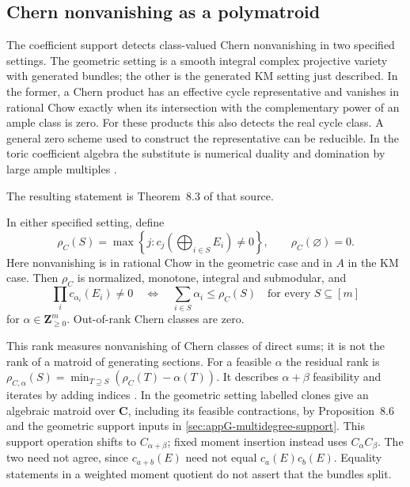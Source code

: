 \subsection{Chern nonvanishing as a polymatroid}
\label{sec:appG-Chern-nonvanishing}

The coefficient support detects class-valued Chern nonvanishing
in two specified settings. The geometric setting is a smooth
integral complex projective variety with generated bundles;
the other is the generated KM setting just described.
In the former, a Chern product has an effective cycle
representative and vanishes in rational Chow exactly when its
intersection with the complementary power of an ample class
is zero. For these products this also detects the real cycle
class. A general zero scheme used to construct the representative
can be reducible. In the toric coefficient algebra the substitute
is numerical duality and domination by large ample multiples
\cite[Lemmas~8.1--8.2]{NguyenDangWang26ChernFlowV4}.

The resulting statement is Theorem~8.3 of that source.
\begin{theorem}
\label{thm:appG-Chern-nonvanishing}
In either specified setting, define
\[
 \rho_C(S)=\max\left\{j:c_j\left(\bigoplus_{i\in S}E_i\right)
                                      \ne0\right\},
 \qquad\rho_C(\varnothing)=0.
\tag{G.31}\label{eq:appG-Chern-rank}
\]
Here nonvanishing is in rational Chow in the geometric case and
in $A$ in the KM case. Then $\rho_C$ is normalized, monotone,
integral and submodular, and
\[
 \prod_i c_{\alpha_i}(E_i)\ne0
   \quad\Longleftrightarrow\quad
 \sum_{i\in S}\alpha_i\leq\rho_C(S)
           \quad\text{for every }S\subseteq[m]
\tag{G.32}\label{eq:appG-Chern-feasibility}
\]
for $\alpha\in\mathbf Z_{\geq0}^m$. Out-of-rank Chern classes
are zero.
\end{theorem}

This rank measures nonvanishing of Chern classes of direct sums;
it is not the rank of a matroid of generating sections.
For a feasible $\alpha$ the residual rank is
$\rho_{C,\alpha}(S)=\min_{T\supseteq S}(\rho_C(T)-\alpha(T))$.
It describes $\alpha+\beta$ feasibility and iterates by adding
indices \cite[Proposition~8.5]{NguyenDangWang26ChernFlowV4}.
In the geometric setting labelled clones give an algebraic matroid
over $\mathbf C$, including its feasible contractions, by
Proposition~8.6 and the geometric support inputs in
\cref{sec:appG-multidegree-support}.
This support operation shifts to $C_{\alpha+\beta}$;
fixed moment insertion instead uses $C_\alpha C_\beta$.
The two need not agree, since $c_{a+b}(E)$ need not equal
$c_a(E)c_b(E)$. Equality statements in a weighted moment quotient
do not assert that the bundles split.

